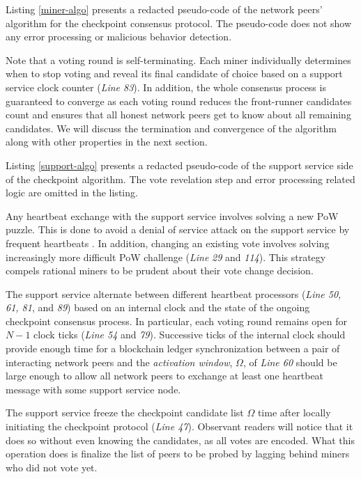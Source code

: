 Listing \ref{miner-algo} presents a redacted pseudo-code of the network peers' algorithm for the checkpoint consensus protocol. The pseudo-code does not show any error processing or malicious behavior detection.

\lstset{caption=A miner's perspective of the checkpoint protocol, label=miner-algo}
 

Note that a voting round is self-terminating. Each miner individually determines when to stop voting and reveal its final candidate of choice based on a support service clock counter (\textit{Line 83}). In addition, the whole consensus process is guaranteed to converge as each voting round reduces the front-runner candidates count and ensures that all honest network peers get to know about all remaining candidates. We will discuss the termination and convergence of the algorithm along with other properties in the next section.

Listing \ref{support-algo} presents a redacted pseudo-code of the support service side of the checkpoint algorithm. The vote revelation step and error processing related logic are omitted in the listing.

\lstset{caption=Support service's perspective of the checkpoint protocol, label=support-algo}


Any heartbeat exchange with the support service involves solving a new PoW puzzle. This is done to avoid a denial of service attack on the support service by frequent heartbeats \cite{Back02hashcash}. In addition, changing an existing vote involves solving increasingly more difficult PoW challenge (\textit{Line} \textit{29} and \textit{114}). This strategy compels rational miners to be prudent about their vote change decision. 

The support service alternate between different heartbeat processors (\textit{Line 50, 61, 81}, and \textit{89}) based on an internal clock and the state of the ongoing checkpoint consensus process. In particular, each voting round remains open for $N - 1$ clock ticks (\textit{Line 54} and \textit{79}). Successive ticks of the internal clock should provide enough time for a blockchain ledger synchronization between a pair of interacting network peers and the \textit{activation window}, $\Omega$, of \textit{Line 60} should be large enough to allow all network peers to exchange at least one heartbeat message with some support service node.

The support service freeze the checkpoint candidate list $\Omega$ time after locally initiating the checkpoint protocol (\textit{Line 47}). Observant readers will notice that it does so without even knowing the candidates, as all votes are encoded. What this operation does is finalize the list of peers to be probed by lagging behind miners who did not vote yet.    
        
